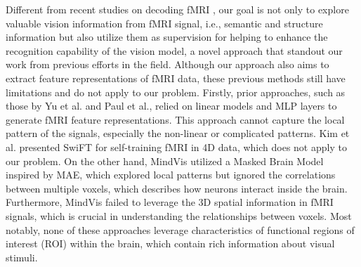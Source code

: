 Different from recent studies on decoding fMRI \cite{takagi2023high, scotti2023reconstructing, chen2023seeing}, our goal is not only to explore valuable vision information from fMRI signal, i.e., semantic and structure information but also utilize them as supervision for helping to enhance the recognition capability of the vision model, a novel approach that standout our work from previous efforts in the field. Although our approach also aims to extract feature representations of fMRI data, these previous methods still have limitations and do not apply to our problem. 
Firstly, prior approaches, such as those by Yu et al. \cite{takagi2023high} and Paul et al., \cite{scotti2023reconstructing} relied on linear models and MLP layers to generate fMRI feature representations. This approach cannot capture the local pattern of the signals, especially the non-linear or complicated patterns. Kim et al. \cite{kim2023swift} presented SwiFT for self-training fMRI in 4D data, which does not apply to our problem. On the other hand, MindVis \cite{chen2023seeing} utilized a Masked Brain Model inspired by MAE, which explored local patterns but ignored the correlations between multiple voxels, which describes how neurons interact inside the brain. Furthermore, MindVis failed to leverage the 3D spatial information in fMRI signals, which is crucial in understanding the relationships between voxels. Most notably, none of these approaches leverage characteristics of functional regions of interest (ROI) within the brain, which contain rich information about visual stimuli. 

